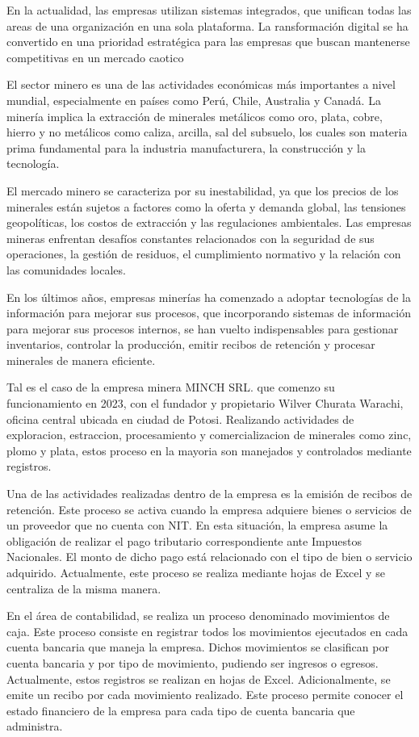 \documentclass[stu]{apa7}
\begin{document}
En la actualidad, las empresas utilizan sistemas integrados, que unifican todas las areas de una organización en una sola plataforma. La ransformación digital se ha convertido en una prioridad estratégica para las empresas que buscan mantenerse competitivas en un mercado caotico

El sector minero es una de las actividades económicas más importantes a nivel mundial, especialmente en países como Perú, Chile, Australia y Canadá. La minería implica la extracción de minerales metálicos como oro, plata, cobre, hierro y no metálicos como caliza, arcilla, sal del subsuelo, los cuales son materia prima fundamental para la industria manufacturera, la construcción y la tecnología.

El mercado minero se caracteriza por su inestabilidad, ya que los precios de los minerales están sujetos a factores como la oferta y demanda global, las tensiones geopolíticas, los costos de extracción y las regulaciones ambientales. Las empresas mineras enfrentan desafíos constantes relacionados con la seguridad de sus operaciones, la gestión de residuos, el cumplimiento normativo y la relación con las comunidades locales.

En los últimos años, empresas minerías ha comenzado a adoptar tecnologías de la información para mejorar sus procesos, que incorporando sistemas de información para mejorar sus procesos internos, se han vuelto indispensables para gestionar inventarios, controlar la producción, emitir recibos de retención y procesar minerales de manera eficiente.

Tal es el caso de la empresa minera MINCH SRL. que comenzo su funcionamiento en 2023, con el fundador y propietario Wilver Churata Warachi, oficina central ubicada en ciudad de Potosi. Realizando actividades de exploracion, estraccion, procesamiento y comercializacion de minerales como zinc, plomo y plata, estos proceso en la mayoria son manejados y controlados mediante registros.

Una de las actividades realizadas dentro de la empresa es la emisión de recibos de retención. Este proceso se activa cuando la empresa adquiere bienes o servicios de un proveedor que no cuenta con NIT. En esta situación, la empresa asume la obligación de realizar el pago tributario correspondiente ante Impuestos Nacionales. El monto de dicho pago está relacionado con el tipo de bien o servicio adquirido. Actualmente, este proceso se realiza mediante hojas de Excel y se centraliza de la misma manera.

En el área de contabilidad, se realiza un proceso denominado movimientos de caja. Este proceso consiste en registrar todos los movimientos ejecutados en cada cuenta bancaria que maneja la empresa. Dichos movimientos se clasifican por cuenta bancaria y por tipo de movimiento, pudiendo ser ingresos o egresos. Actualmente, estos registros se realizan en hojas de Excel. Adicionalmente, se emite un recibo por cada movimiento realizado. Este proceso permite conocer el estado financiero de la empresa para cada tipo de cuenta bancaria que administra.
\end{document}
